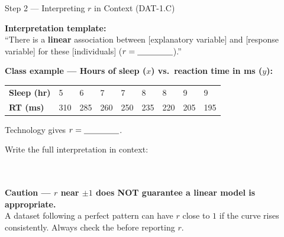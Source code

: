 \documentclass[10pt]{article}
\begin{document}
\begin{notesbox}{Step 2 --- Interpreting $r$ in Context (DAT-1.C)}
\small

\noindent \textbf{Interpretation template:}\\[6pt]
``There is a \blank{3cm} \blank{3.5cm} \textbf{linear} association between
[explanatory variable] and [response variable] for these [individuals] ($r = \blank{1.5cm}$).''

\vspace{8pt}
\textbf{Class example --- Hours of sleep ($x$) vs.\ reaction time in ms ($y$):}

\vspace{4pt}
\renewcommand{\arraystretch}{1.4}
\begin{tabularx}{\linewidth}{@{} l *{8}{C{1cm}} @{}}
\textbf{Sleep (hr)} & 5 & 6 & 7 & 7 & 8 & 8 & 9 & 9 \\
\textbf{RT (ms)}    & 310 & 285 & 260 & 250 & 235 & 220 & 205 & 195 \\
\end{tabularx}

\vspace{6pt}
Technology gives $r = \blank{1.5cm}$.

\vspace{6pt}
Write the full interpretation in context:\\[6pt]
\writeline\\[1pt]\writeline\\[1pt]\writeline

\vspace{6pt}
\textbf{Caution --- $r$ near $\pm1$ does NOT guarantee a linear model is appropriate.}\\
A dataset following a perfect \blank{3cm} pattern can have $r$ close to $1$ if the
curve rises consistently. Always check the \blank{3cm} before reporting $r$.
\end{notesbox}

\vspace{0.08in}
\end{document}
